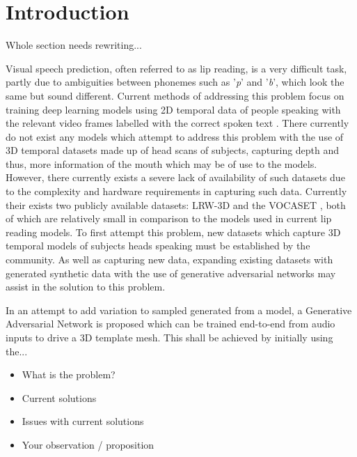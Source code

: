 %
%
%
%
%

\chapter{Introduction}

Whole section needs rewriting...

Visual speech prediction, often referred to as lip reading, is a very difficult task, partly due to ambiguities between phonemes such as '\textit{p}' and '\textit{b}', which look the same but sound different.
Current methods of addressing this problem focus on training deep learning models using 2D temporal data of people speaking with the relevant video frames labelled with the correct spoken text \cite{Chung2016, Assael2016, Chung2017, Shillingford2018}.
There currently do not exist any models which attempt to address this problem with the use of 3D temporal datasets made up of head scans of subjects, capturing depth and thus, more information of the mouth which may be of use to the models.
However, there currently exists a severe lack of availability of such datasets due to the complexity and hardware requirements in capturing such data.
Currently their exists two publicly available datasets: LRW-3D \cite{Tzirakis2019} and the VOCASET \cite{Cudeiro2019}, both of which are relatively small in comparison to the models used in current lip reading models.
To first attempt this problem, new datasets which capture 3D temporal models of subjects heads speaking must be established by the community.
As well as capturing new data, expanding existing datasets with generated synthetic data with the use of generative adversarial networks may assist in the solution to this problem.

In an attempt to add variation to sampled generated from a model, a Generative Adversarial Network is proposed which can be trained end-to-end from audio inputs to drive a 3D template mesh.
This shall be achieved by initially using the...

\begin{itemize}

    \item What is the problem?
    \item Current solutions
    \item Issues with current solutions
    \item Your observation / proposition

\end{itemize}

%
%
%